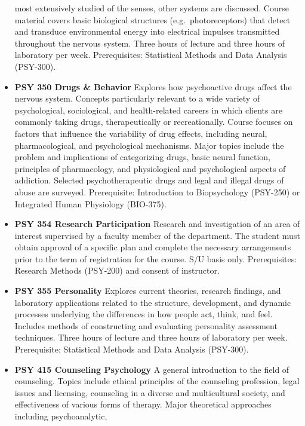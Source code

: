 \documentclass[
  letterpaper,
]{scrbook}
\begin{document}
\begin{itemize}
  most extensively studied of the senses, other systems are discussed.
  Course material covers basic biological structures
  (e.g.~photoreceptors) that detect and transduce environmental energy
  into electrical impulses transmitted throughout the nervous system.
  Three hours of lecture and three hours of laboratory per week.
  Prerequisites: Statistical Methods and Data Analysis (PSY-300).\\
\item
  \textbf{PSY 350 Drugs \& Behavior} Explores how psychoactive drugs
  affect the nervous system. Concepts particularly relevant to a wide
  variety of psychological, sociological, and health-related careers in
  which clients are commonly taking drugs, therapeutically or
  recreationally. Course focuses on factors that influence the
  variability of drug effects, including neural, pharmacological, and
  psychological mechanisms. Major topics include the problem and
  implications of categorizing drugs, basic neural function, principles
  of pharmacology, and physiological and psychological aspects of
  addiction. Selected psychotherapeutic drugs and legal and illegal
  drugs of abuse are surveyed. Prerequisite: Introduction to
  Biopsychology (PSY-250) or Integrated Human Physiology (BIO-375).
\item
  \textbf{PSY 354 Research Participation} Research and investigation of
  an area of interest supervised by a faculty member of the department.
  The student must obtain approval of a specific plan and complete the
  necessary arrangements prior to the term of registration for the
  course. S/U basis only. Prerequisites: Research Methods (PSY-200) and
  consent of instructor.
\item
  \textbf{PSY 355 Personality} Explores current theories, research
  findings, and laboratory applications related to the structure,
  development, and dynamic processes underlying the differences in how
  people act, think, and feel. Includes methods of constructing and
  evaluating personality assessment techniques. Three hours of lecture
  and three hours of laboratory per week. Prerequisite: Statistical
  Methods and Data Analysis (PSY-300).\\
\item
  \textbf{PSY 415 Counseling Psychology} A general introduction to the
  field of counseling. Topics include ethical principles of the
  counseling profession, legal issues and licensing, counseling in a
  diverse and multicultural society, and effectiveness of various forms
  of therapy. Major theoretical approaches including psychoanalytic,

\end{itemize}
\end{document}
